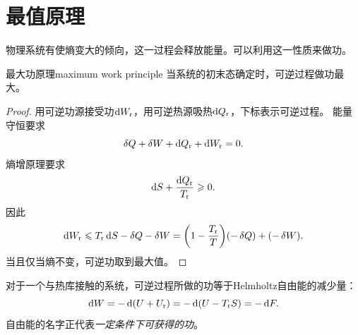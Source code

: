 \section{最值原理}

物理系统有使熵变大的倾向，这一过程会释放能量。可以利用这一性质来做功。

\begin{theorem}
	{最大功原理}{maximum work principle}
	当系统的初末态确定时，可逆过程做功最大。
\end{theorem}

\newcommand{\rev}{_{\mathrm r}}

\begin{proof}
	用可逆功源接受功$\d W\rev$，用可逆热源吸热$\d Q\rev$，下标表示可逆过程。
	能量守恒要求
	\[
		\vd Q+\vd W+\d Q\rev+\d W\rev=0.
	\]
	熵增原理要求
	\[
		\d S+\frac{\d Q\rev}{T\rev}\geq 0.
	\]
	因此
	\[
		\d W\rev\leqslant T\rev\d S-\vd Q-\vd W=\biggkh{1-\frac{T\rev}{T}}(-\vd Q)+(-\vd W).
	\]
	当且仅当熵不变，可逆功取到最大值。
\end{proof}

\begin{corollary}
	对于一个与热库接触的系统，可逆过程所做的功等于Helmholtz自由能的减少量：
	\[
		\d W=-\d(U+U\rev)=-\d(U-T\rev S)=-\d F.
	\]
	自由能的名字正代表\textit{一定条件下可获得的功}。
\end{corollary}

